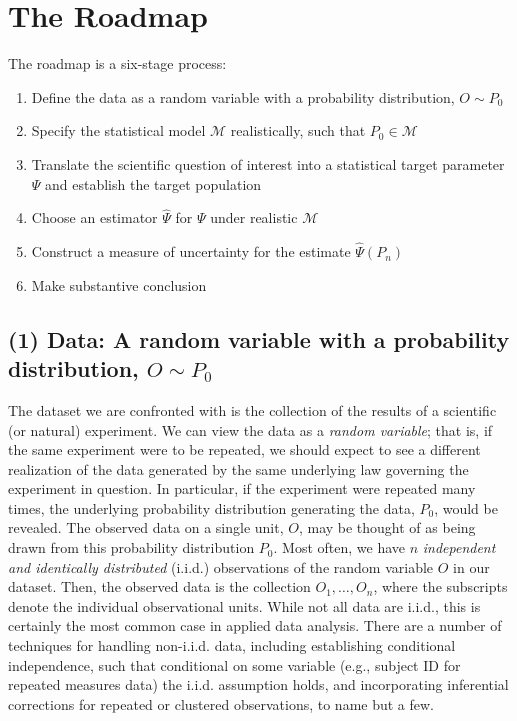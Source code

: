 \documentclass[
  12pt, krantz2,
]{krantz}
\providecommand{\tightlist}{%
  \setlength{\itemsep}{0pt}\setlength{\parskip}{0pt}}
\newcommand{\M}{\mathcal{M}}
\newcommand{\1}{\mathbbm{1}}
\theoremstyle{definition}
\theoremstyle{definition}
\theoremstyle{definition}
\theoremstyle{definition}
\theoremstyle{remark}
\begin{document}
\hypertarget{roadmap-steps}{%
\section{The Roadmap}\label{roadmap-steps}}

The roadmap is a six-stage process:

\begin{enumerate}
\def\labelenumi{\arabic{enumi}.}
\tightlist
\item
  Define the data as a random variable with a probability distribution, \(O \sim P_0\)
\item
  Specify the statistical model \(\M\) realistically, such that \(P_0 \in \M\)
\item
  Translate the scientific question of interest into a statistical target
  parameter \(\Psi\) and establish the target population
\item
  Choose an estimator \(\hat{\Psi}\) for \(\Psi\) under realistic \(\M\)
\item
  Construct a measure of uncertainty for the estimate \(\hat{\Psi}(P_n)\)
\item
  Make substantive conclusion
\end{enumerate}

\hypertarget{data-a-random-variable-with-a-probability-distribution-o-sim-p_0}{%
\subsection*{\texorpdfstring{(1) Data: A random variable with a probability distribution, \(O \sim P_0\)}{(1) Data: A random variable with a probability distribution, O \textbackslash sim P\_0}}\label{data-a-random-variable-with-a-probability-distribution-o-sim-p_0}}


The dataset we are confronted with is the collection of the results of a
scientific (or natural) experiment. We can view the data as a \emph{random variable};
that is, if the same experiment were to be repeated, we should expect to see a
different realization of the data generated by the same underlying law governing
the experiment in question. In particular, if the experiment were repeated many
times, the underlying probability distribution generating the data, \(P_0\), would
be revealed. The observed data on a single unit, \(O\), may be thought of as being
drawn from this probability distribution \(P_0\). Most often, we have \(n\)
\emph{independent and identically distributed} (i.i.d.) observations of the random
variable \(O\) in our dataset. Then, the observed data is the collection \(O_1, \ldots, O_n\), where the subscripts denote the individual observational units.
While not all data are i.i.d., this is certainly the most common case in applied
data analysis. There are a number of techniques for handling non-i.i.d. data,
including establishing conditional independence, such that conditional on some
variable (e.g., subject ID for repeated measures data) the i.i.d. assumption
holds, and incorporating inferential corrections for repeated or clustered
observations, to name but a few.
\end{document}
